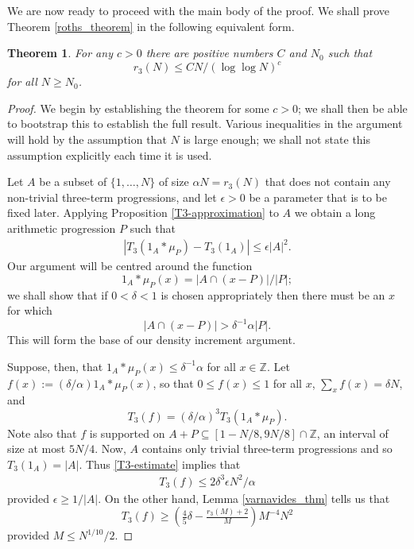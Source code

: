 \documentclass[12pt,a4paper,reqno]{amsart}
\numberwithin{equation}{section}
\theoremstyle{plain}
\newtheorem{theorem}{Theorem}[section]
\theoremstyle{definition}
\renewcommand{\leq}{\leqslant}
\renewcommand{\geq}{\geqslant}
\renewcommand{\subset}{\subseteq}
\def\Z{\mathbb{Z}}
\DeclareMathOperator{\ssum}{\textstyle{\sum\nolimits}}
\begin{document}
We are now ready to proceed with the main body of the proof. We shall prove Theorem \ref{roths_theorem} in the following equivalent form.

\begin{theorem}
For any $c > 0$ there are positive numbers $C$ and $N_0$ such that
\[ r_3(N) \leq C N/(\log\log{N})^c \]
for all $N \geq N_0$.
\end{theorem}
\begin{proof}
We begin by establishing the theorem for some $c > 0$; we shall then be able to bootstrap this to establish the full result. Various inequalities in the argument will hold by the assumption that $N$ is large enough; we shall not state this assumption explicitly each time it is used.

Let $A$ be a subset of $\{1,\ldots, N\}$ of size $\alpha N = r_3(N)$ that does not contain any non-trivial three-term progressions, and let $\epsilon > 0$ be a parameter that is to be fixed later. Applying Proposition \ref{T3-approximation} to $A$ we obtain a long arithmetic progression $P$ such that 
\begin{align} | T_3(1_A * \mu_P) - T_3(1_A) | \leq \epsilon |A|^2. \label{T3-estimate}\end{align}
Our argument will be centred around the function
\[ 1_A*\mu_P(x) = |A \cap (x-P)|/|P|; \]
we shall show that if $0 < \delta < 1$ is chosen appropriately then there must be an $x$ for which \[ |A\cap(x-P)| > \delta^{-1}\alpha |P|. \]
This will form the base of our density increment argument.

Suppose, then, that $1_A*\mu_P(x) \leq \delta^{-1} \alpha$ for all $x \in \Z$. Let $f(x) := (\delta/\alpha)1_A*\mu_P(x)$, so that $0 \leq f(x) \leq 1$ for all $x$, $\ssum_x f(x) = \delta N$, and 
\[ T_3(f) = (\delta/\alpha)^3 T_3(1_A*\mu_P). \]
Note also that $f$ is supported on $A+P \subset [1-N/8, 9N/8] \cap \Z$, an interval of size at most $5N/4$. Now, $A$ contains only trivial three-term progressions and so $T_3(1_A) = |A|$. Thus \eqref{T3-estimate} implies that
\begin{align}
T_3(f) \leq 2 \delta^3\epsilon N^2/\alpha \label{T3(f)_upper-bound}
\end{align}
provided $\epsilon \geq 1/|A|$. On the other hand, Lemma \ref{varnavides_thm} tells us that 
\[ T_3(f) \geq \left(\tfrac{4}{5}\delta - \tfrac{r_3(M) + 2}{M}\right) M^{-4} N^2 \]
provided $M \leq N^{1/10}/2$.


\end{proof}
\end{document}

